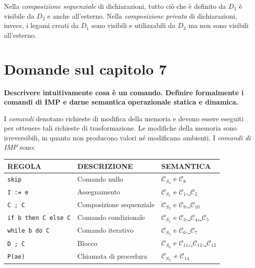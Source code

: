\documentclass[a4paper,oneside,titlepage]{book}
\begin{document}
Nella \emph{composizione sequenziale} di dichiarazioni, tutto ciò che è definito da $D_1$ è visibile da $D_2$ e anche all'esterno. Nella \emph{composizione privata} di dichiarazioni, invece, i legami creati da $D_1$ sono visibili e utilizzabili da $D_2$ ma non sono visibili all'esterno.

\section{Domande sul capitolo 7}
\textbf{Descrivere intuitivamente cosa è un comando. Definire formalmente i comandi di IMP e darne semantica operazionale statica e dinamica.}

I \emph{comandi} denotano richieste di modifica della memoria e devono essere eseguiti per ottenere tali richieste di trasformazione. Le modifiche della memoria sono irreversibili, in quanto non producono valori né modificano ambienti. I \emph{comandi di IMP} sono:
\begin{center}
	\begin{tabular}{lll}
		\toprule
		\textbf{REGOLA} & \textbf{DESCRIZIONE} & \textbf{SEMANTICA} \\
		
		\midrule
		\lstinline|skip| & Comando nullo & \hyperref[sec:comSemStat]{$\mathcal{C}_{S_4}$} e \hyperref[sec:comSemDin]{$\mathcal{C}_8$} \\
		
		\midrule
		\lstinline|I := e| & Assegnamento & \hyperref[sec:comSemStat]{$\mathcal{C}_{S_1}$} e \hyperref[sec:comSemDin]{$\mathcal{C}_1$, $\mathcal{C}_2$} \\
		
		\midrule
		\lstinline|C ; C| & Composizione sequenziale & \hyperref[sec:comSemStat]{$\mathcal{C}_{S_3}$} e \hyperref[sec:comSemDin]{$\mathcal{C}_9$, $\mathcal{C}_{10}$} \\
		
		\midrule
		\lstinline|if b then C else C| & Comando condizionale & \hyperref[sec:comSemStat]{$\mathcal{C}_{S_2}$} e \hyperref[sec:comSemDin]{$\mathcal{C}_3$, $\mathcal{C}_4$, $\mathcal{C}_5$} \\
		
		\midrule
		\lstinline|while b do C| & Comando iterativo & \hyperref[sec:comSemStat]{$\mathcal{C}_{S_5}$} e \hyperref[sec:comSemDin]{$\mathcal{C}_6$, $\mathcal{C}_7$} \\
		
		\midrule
		\lstinline|D ; C| & Blocco & \hyperref[sec:comSemStat]{$\mathcal{C}_{S_6}$} e \hyperref[sec:comSemDin]{$\mathcal{C}_{11}$, $\mathcal{C}_{12}$, $\mathcal{C}_{13}$} \\
		
		\midrule
		\lstinline|P(ae)| & Chiamata di procedura & \hyperref[sec:decSemStat3]{$\mathcal{C}_{S_{5^{'}}}$} e \hyperref[sec:decSemDin3]{$\mathcal{C}_{14}$} \\
		
		\bottomrule
	\end{tabular}
\end{center}
\end{document}
